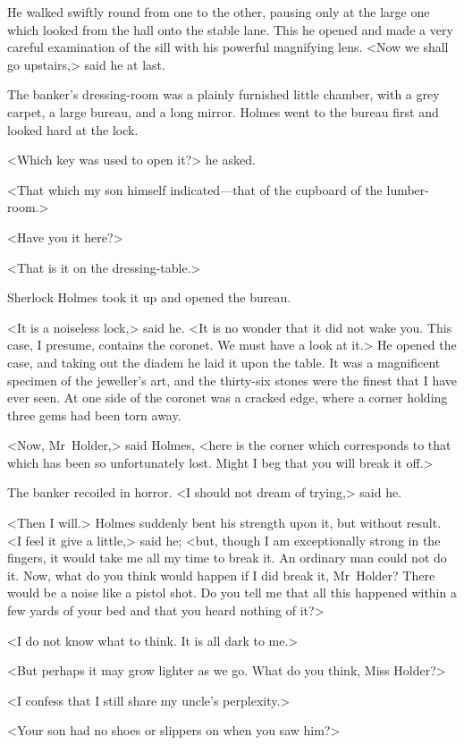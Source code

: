 He walked swiftly round from one to the other, pausing only at the large one which looked from the hall onto the stable lane. This he opened and made a very careful examination of the sill with his powerful magnifying lens. <Now we shall go upstairs,> said he at last.

The banker's dressing-room was a plainly furnished little chamber, with a grey carpet, a large bureau, and a long mirror. Holmes went to the bureau first and looked hard at the lock.

<Which key was used to open it?> he asked.

<That which my son himself indicated—that of the cupboard of the lumber-room.>

<Have you it here?>

<That is it on the dressing-table.>

Sherlock Holmes took it up and opened the bureau.

<It is a noiseless lock,> said he. <It is no wonder that it did not wake you. This case, I presume, contains the coronet. We must have a look at it.> He opened the case, and taking out the diadem he laid it upon the table. It was a magnificent specimen of the jeweller's art, and the thirty-six stones were the finest that I have ever seen. At one side of the coronet was a cracked edge, where a corner holding three gems had been torn away.

<Now, Mr~Holder,> said Holmes, <here is the corner which corresponds to that which has been so unfortunately lost. Might I beg that you will break it off.>

The banker recoiled in horror. <I should not dream of trying,> said he.

<Then I will.> Holmes suddenly bent his strength upon it, but without result. <I feel it give a little,> said he; <but, though I am exceptionally strong in the fingers, it would take me all my time to break it. An ordinary man could not do it. Now, what do you think would happen if I did break it, Mr~Holder? There would be a noise like a pistol shot. Do you tell me that all this happened within a few yards of your bed and that you heard nothing of it?>

<I do not know what to think. It is all dark to me.>

<But perhaps it may grow lighter as we go. What do you think, Miss Holder?>

<I confess that I still share my uncle's perplexity.>

<Your son had no shoes or slippers on when you saw him?>


